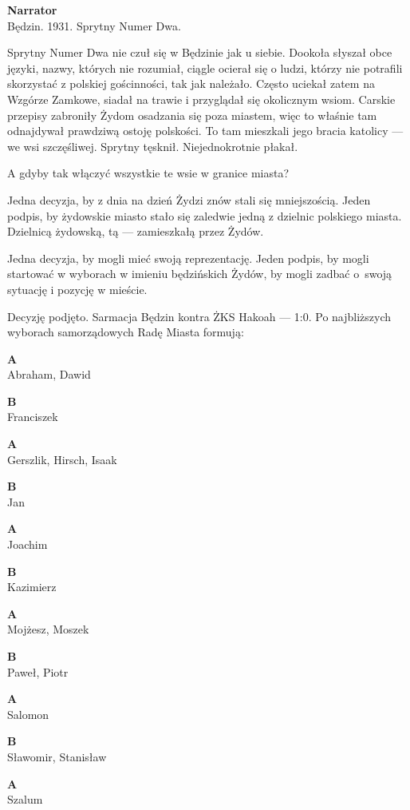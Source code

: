 \documentclass[11pt,a4paper,oneside]{article}
\begin{document}
\textbf{Narrator}\\
Będzin. 1931. Sprytny Numer Dwa. 

Sprytny Numer Dwa nie czuł się w Będzinie jak u siebie. Dookoła
słyszał obce języki, nazwy, których nie rozumiał, ciągle ocierał się o
ludzi, którzy nie potrafili skorzystać z polskiej gościnności, tak jak
należało. Często uciekał zatem na Wzgórze Zamkowe, siadał na trawie i
przyglądał się okolicznym wsiom. Carskie przepisy zabroniły Żydom
osadzania się poza miastem, więc to właśnie tam odnajdywał prawdziwą
ostoję polskości. To tam mieszkali jego bracia katolicy --- we wsi
szczęśliwej. Sprytny tęsknił. Niejednokrotnie płakał.

A gdyby tak włączyć wszystkie te wsie w granice miasta?

Jedna decyzja, by z dnia na dzień Żydzi znów stali się mniejszością.
Jeden podpis, by żydowskie miasto stało się zaledwie jedną z dzielnic
polskiego miasta.  Dzielnicą żydowską, tą --- zamieszkałą przez Żydów. 

Jedna decyzja, by mogli mieć swoją reprezentację. Jeden podpis, by %
mogli startować w wyborach w imieniu będzińskich Żydów, by mogli
zadbać o~swoją sytuację i pozycję w mieście. 

Decyzję podjęto. Sarmacja Będzin kontra ŻKS Hakoah --- 1:0. Po
najbliższych wyborach samorządowych Radę Miasta formują:

\textbf{A}\\
Abraham, Dawid

\textbf{B}\\
Franciszek

\textbf{A}\\
Gerszlik, Hirsch, Isaak

\textbf{B}\\
Jan

\textbf{A}\\
Joachim

\textbf{B}\\
Kazimierz

\textbf{A}\\
Mojżesz,  Moszek

\textbf{B}\\
Paweł, Piotr

\textbf{A}\\
Salomon

\textbf{B}\\
Sławomir,  Stanisław

\textbf{A}\\
Szalum
\end{document}
